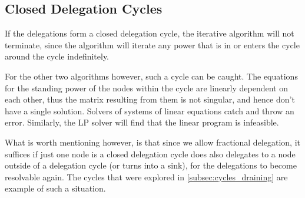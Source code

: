 \subsection{Closed Delegation Cycles}

If the delegations form a closed delegation cycle, the iterative algorithm will not terminate, since the algorithm will iterate any power that is in or enters the cycle around the cycle indefinitely. 

For the other two algorithms however, such a cycle can be caught. The equations for the standing power of the nodes within the cycle are linearly dependent on each other, thus the matrix resulting from them is not singular, and hence don't have a single solution. Solvers of systems of linear equations catch and throw an error. Similarly, the LP solver will find that the linear program is infeasible.

What is worth mentioning however, is that since we allow fractional delegation, it suffices if just one node is a closed delegation cycle does also delegates to a node outside of a delegation cycle (or turns into a sink), for the delegations to become resolvable again. The cycles that were explored in \cref{subsec:cycles_draining} are example of such a situation. 


